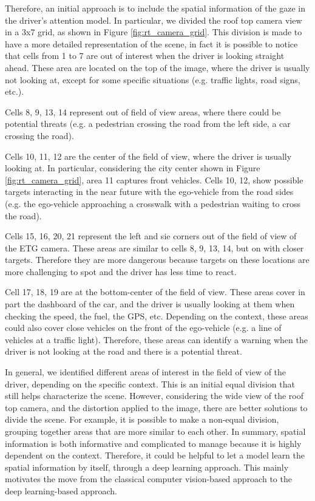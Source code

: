 Therefore, an initial approach is to include the spatial information of the 
gaze in the driver's attention model. In particular, we divided the roof top 
camera view in a 3x7 grid, as shown in Figure \ref{fig:rt_camera_grid}. 
This division is made to have a more detailed representation of the scene, in 
fact it is possible to notice that cells from  1 to 7 are out of interest when 
the driver is looking straight ahead. These area are 
located on the top of the image, where the driver is usually not looking at, 
except for some specific situations (e.g. traffic lights, road signs, etc.). 

Cells 8, 9, 13, 14 represent out of field of view areas, where there could be 
potential threats (e.g. a pedestrian crossing the road from the left side, 
a car crossing the road). 

Cells 10, 11, 12 are the center of the field of view, 
where the driver is usually looking at. In particular, considering the city 
center shown in Figure \ref{fig:rt_camera_grid}, area 11 captures front 
vehicles. 
Cells 10, 12, show possible targets interacting 
in the near future with the ego-vehicle 
from the road sides (e.g. the ego-vehicle approaching a crosswalk with a 
pedestrian waiting to cross the road).

Cells 15, 16, 20, 21 represent the left and sie corners out of the field of view 
of the ETG camera. These areas are similar to cells 8, 9, 13, 14, but on with 
closer targets. Therefore they are more dangerous because targets on these 
locations are more challenging to spot and the driver has less time to react.

Cell 17, 18, 19 are at the bottom-center of the field of view.
These areas cover in part the dashboard of the car, and the driver is usually 
looking at them when checking the speed, the fuel, the GPS, etc. 
Depending on the context, these areas could also cover close vehicles on the 
front of the ego-vehicle (e.g. a line of vehicles at a traffic light). 
Therefore, these areas can identify a warning when the driver is not 
looking at the road and there is a potential threat.

In general, we identified different areas of interest in the field of view of 
the driver, depending on the specific context. This is an initial equal division 
that still helps characterize the scene. However, considering the wide view of 
the roof top camera, and the distortion applied to the image, there are better 
solutions to divide the scene. For example, it is possible to make a non-equal 
division, grouping together areas that are more similar to each other.
In summary, spatial information is both informative and complicated to manage 
because it is highly dependent on the context. Therefore, it could be helpful 
to let a model learn the spatial information by itself, through a deep learning 
approach. This mainly motivates the move from the classical computer 
vision-based approach to the deep learning-based approach.
 
